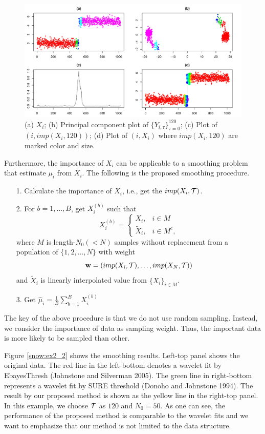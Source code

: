 \documentclass[preprint, review, 12pt]{article}
\theoremstyle{definition}
\theoremstyle{remark}
\begin{document}
\begin{figure}
	\centering
	\includegraphics[width=1\textwidth]{Fig/snow_ex2_fig1.pdf}
	\caption{(a) $X_i$; (b) Principal component plot of $\{Y_{i,\tau}\}_{\tau=0}^{120}$; (c) Plot of $(i,imp(X_i,120))$; (d) Plot of $(i,X_i)$ where $imp(X_i,120)$ are marked color and size.}
	\label{snow:ex2_1}
\end{figure}

Furthermore, the importance of $X_i$ can be applicable to a smoothing problem that estimate $\mu_i$ from $X_i$. The following is the proposed smoothing procedure. 
\begin{itemize}
	\item[1. ] Calculate the importance of $X_i$, i.e., get the $imp(X_i,{\cal T})$. 
	\item[2. ] For $b=1,\dots,B$, get $X_i^{(b)}$ such that 
	\[
	X_i^{(b)}=\begin{cases} X_i, & i \in M \\ 
	\tilde{X}_i, & i \in M^c,
	\end{cases}
	\]
	where $M$ is length-$N_0(<N)$ samples without replacement from a population of $\{1,2,\dots,N\}$ with weight $$\mathbf{w}=\left(imp(X_i,{\cal T}),\dots,imp(X_N,{\cal T})\right)$$ and $\tilde{X}_i$ is linearly interpolated value from $\{X_i\}_{i\in M}$. 
	\item[3. ] Get $\hat{\mu}_i=\frac{1}{B}\sum_{b=1}^{B}X_i^{(b)}$ 
\end{itemize}
The key of the above procedure is that we do not use random sampling. Instead, we consider the importance of data as sampling weight. Thus, the important data is more likely to be sampled than other. 

Figure \ref{snow:ex2_2} shows the smoothing results. Left-top panel shows the original data. The red line in the left-bottom denotes a  wavelet fit by EbayesThresh (Johnstone and Silverman 2005). The green line in right-bottom represents a wavelet fit by SURE threshold (Donoho and Johnstone 1994). The result by our proposed method is shown as the yellow line in the right-top panel. In this example, we choose $\cal T$ as $120$ and $N_0=50$. As one can see, the performance of the proposed method is comparable to  the wavelet fits and we want to emphasize that our method is not limited to the data structure. 
\end{document}
